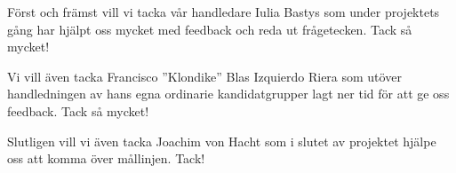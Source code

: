 Först och främst vill vi tacka vår handledare Iulia Bastys som under projektets gång har hjälpt oss mycket med feedback och reda ut frågetecken.
Tack så mycket!

Vi vill även tacka Francisco ''Klondike'' Blas Izquierdo Riera som utöver handledningen av hans egna ordinarie kandidatgrupper lagt ner tid för att ge oss feedback.
Tack så mycket!

Slutligen vill vi även tacka Joachim von Hacht som i slutet av projektet hjälpe oss att komma över mållinjen.
Tack!
